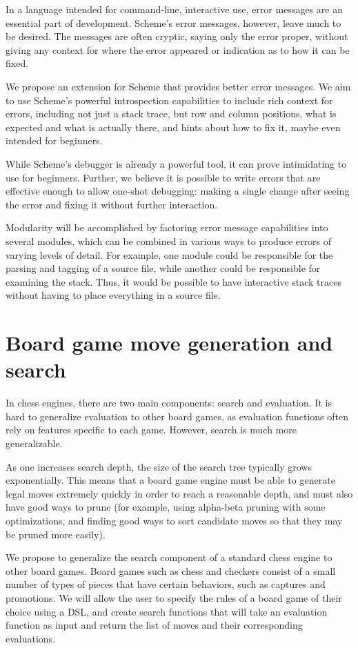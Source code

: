 \documentclass{scrartcl}
\begin{document}
In a language intended for command-line, interactive use, error messages are an
essential part of development. Scheme's error messages, however, leave much to
be desired. The messages are often cryptic, saying only the error proper,
without giving any context for where the error appeared or indication as to how
it can be fixed.

We propose an extension for Scheme that provides better error messages. We aim
to use Scheme's powerful introspection capabilities to include rich context for
errors, including not just a stack trace, but row and column positions, what is
expected and what is actually there, and hints about how to fix it, maybe even
intended for beginners.

While Scheme's debugger is already a powerful tool, it can prove intimidating
to use for beginners. Further, we believe it is possible to write errors that
are effective enough to allow one-shot debugging: making a single change after
seeing the error and fixing it without further interaction.

Modularity will be accomplished by factoring error message capabilities into
several modules, which can be combined in various ways to produce errors of
varying levels of detail. For example, one module could be responsible for the
parsing and tagging of a source file, while another could be responsible for
examining the stack. Thus, it would be possible to have interactive stack
traces without having to place everything in a source file.



\section{Board game move generation and search}
In chess engines, there are two main components: search and evaluation.
It is hard to generalize evaluation to other board games,
as evaluation functions often rely on features specific to each game.
However, search is much more generalizable.

As one increases search depth, the size of the search tree typically grows
exponentially. This means that a board game engine must be able to
generate legal moves extremely quickly in order to reach a reasonable depth,
and must also have good ways to prune
(for example, using alpha-beta pruning with some optimizations, and finding
good ways to sort candidate moves so that they may be pruned more easily).

We propose to generalize the search component of a standard chess engine
to other board games. Board games such as chess and checkers consist of
a small number of types of pieces that have certain behaviors,
such as captures and promotions.
We will allow the user to specify the rules of a board game
of their choice using a DSL, and create search functions that will
take an evaluation function as input and return the list of moves
and their corresponding evaluations.
\end{document}
